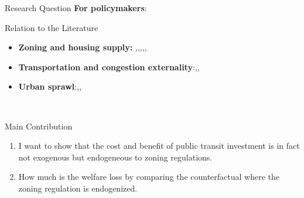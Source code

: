 \documentclass[10pt]{beamer}
\begin{document}
\begin{frame}{Research Question}
\textbf{For policymakers}:

\end{frame}

\begin{frame}{Relation to the Literature}
\begin{itemize}
    \item \textbf{Zoning and housing supply:} \textcite{Glaeser2003-sr},\textcite{Hsieh2019-rx}\textcite{Baum-Snow2024-ii},\textcite{Rollet2025-mk},\textcite{Glaeser2002-vq},\textcite{Bordeu2026-df},\textcite{Kashner2025-iv}

    \item \textbf{Transportation and congestion externality}:\textcite{Severen2021-oi},\textcite{Allen2025-gj},\textcite{Baum-Snow2007-zj}\textcite{Fajgelbaum2023-dr}
    \item \textbf{Urban sprawl}:\textcite{Brueckner2000-vd},\textcite{Glaeser2003-sr},\textcite{Coeurdacier2022-ip}
\end{itemize}
\
\begin{block}{Main Contribution}
\begin{enumerate}
    \item I want to show that the cost and benefit of public transit investment is in fact not exogenous but endogeneous to zoning regulations.
    \item How much is the welfare loss by comparing the counterfactual where the zoning regulation is endogenized.
\end{enumerate}
\end{block}
\end{frame}
\end{document}
